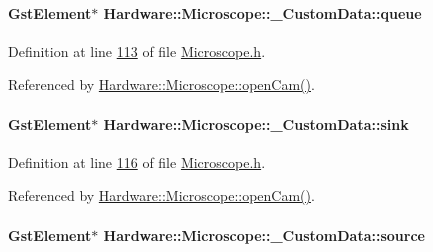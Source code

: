\hypertarget{struct_hardware_1_1_microscope_1_1___custom_data_a035f8650ed7e1d28459fbbb8f680a4bf}{}
\paragraph[{queue}]{\setlength{\rightskip}{0pt plus 5cm}Gst\+Element$\ast$ Hardware\+::\+Microscope\+::\+\_\+\+Custom\+Data\+::queue}\label{struct_hardware_1_1_microscope_1_1___custom_data_a035f8650ed7e1d28459fbbb8f680a4bf}


Definition at line \hyperlink{_microscope_8h_source_l00113}{113} of file \hyperlink{_microscope_8h_source}{Microscope.\+h}.



Referenced by \hyperlink{_microscope_8cpp_source_l00167}{Hardware\+::\+Microscope\+::open\+Cam()}.

\hypertarget{struct_hardware_1_1_microscope_1_1___custom_data_afc35bf0fc822422a2b979fdfca74b14c}{}
\paragraph[{sink}]{\setlength{\rightskip}{0pt plus 5cm}Gst\+Element$\ast$ Hardware\+::\+Microscope\+::\+\_\+\+Custom\+Data\+::sink}\label{struct_hardware_1_1_microscope_1_1___custom_data_afc35bf0fc822422a2b979fdfca74b14c}


Definition at line \hyperlink{_microscope_8h_source_l00116}{116} of file \hyperlink{_microscope_8h_source}{Microscope.\+h}.



Referenced by \hyperlink{_microscope_8cpp_source_l00167}{Hardware\+::\+Microscope\+::open\+Cam()}.

\hypertarget{struct_hardware_1_1_microscope_1_1___custom_data_a2bc62de54f6ee34ef2fda4f8b1f17808}{}
\paragraph[{source}]{\setlength{\rightskip}{0pt plus 5cm}Gst\+Element$\ast$ Hardware\+::\+Microscope\+::\+\_\+\+Custom\+Data\+::source}\label{struct_hardware_1_1_microscope_1_1___custom_data_a2bc62de54f6ee34ef2fda4f8b1f17808}


